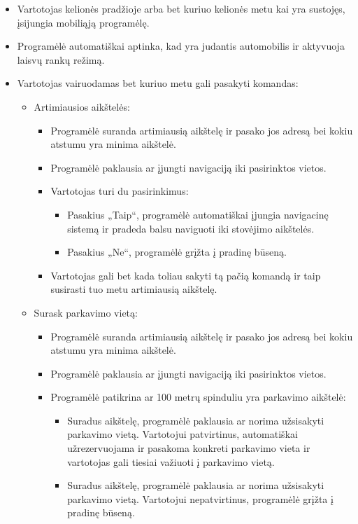 \documentclass{VUMIFPSkursinis}
\begin{document}
\begin{enumerate}
		\begin{itemize}
			\item Vartotojas kelionės pradžioje arba bet kuriuo kelionės metu kai yra sustojęs, įsijungia mobiliąją programėlę.
			\item Programėlė automatiškai aptinka, kad yra judantis automobilis ir aktyvuoja laisvų rankų režimą.
			\item Vartotojas vairuodamas bet kuriuo metu gali pasakyti komandas:
				\begin{itemize}
					\item Artimiausios aikštelės:
						\begin{itemize}
							\item Programėlė suranda artimiausią aikštelę ir pasako jos adresą bei kokiu atstumu yra minima aikštelė.
							\item Programėlė paklausia ar įjungti navigaciją iki pasirinktos vietos.
							\item Vartotojas turi du pasirinkimus:
								\begin{itemize}
									\item Pasakius „Taip“, programėlė automatiškai įjungia navigacinę sistemą ir pradeda balsu naviguoti iki stovėjimo aikštelės.
									\item Pasakius „Ne“, programėlė grįžta į pradinę būseną.
								\end{itemize}
							\item Vartotojas gali bet kada toliau sakyti tą pačią komandą ir taip susirasti tuo metu artimiausią aikštelę.
						\end{itemize}
					\item Surask parkavimo vietą:
						\begin{itemize}
							\item Programėlė suranda artimiausią aikštelę ir pasako jos adresą bei kokiu atstumu yra minima aikštelė.
							\item Programėlė paklausia ar įjungti navigaciją iki pasirinktos vietos.
							\item Programėlė patikrina ar 100 metrų spinduliu yra parkavimo aikštelė:
								\begin{itemize}
									\item Suradus aikštelę, programėlė paklausia ar norima užsisakyti parkavimo vietą. Vartotojui patvirtinus, automatiškai užrezervuojama ir pasakoma konkreti parkavimo vieta ir vartotojas gali tiesiai važiuoti į parkavimo vietą.
									\item Suradus aikštelę, programėlė paklausia ar norima užsisakyti parkavimo vietą. Vartotojui nepatvirtinus, programėlė grįžta į pradinę būseną.

\end{itemize}
\end{itemize}
\end{itemize}
\end{itemize}
\end{enumerate}
\end{document}
